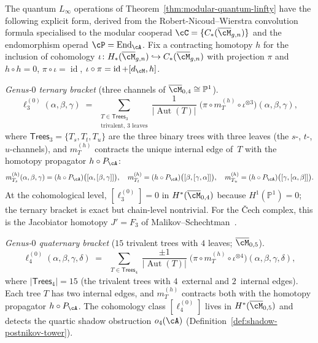 \begin{construction}
\label{constr:explicit-convolution-linfty}
The quantum $L_\infty$ operations of
Theorem~\textup{\ref{thm:modular-quantum-linfty}} have the following
explicit form, derived from the Robert-Nicoud--Wierstra convolution
formula \cite[Theorem~5.1]{RNW19} specialised to the modular
cooperad $\cC = \{C_*(\overline{\cM}_{g,n})\}$ and the
endomorphism operad $\cP = \operatorname{End}_{\cA}$.  Fix a contracting
homotopy $h$ for the inclusion of cohomology
$\iota\colon H_*(\overline{\cM}_{g,n}) \hookrightarrow
C_*(\overline{\cM}_{g,n})$ with projection $\pi$ and
$h \circ h = 0$, $\pi \circ \iota = \operatorname{id}$,
$\iota \circ \pi = \operatorname{id} + [d_{\cM}, h]$.

\emph{Genus-$0$ ternary bracket}
\textup{(}three channels of $\overline{\cM}_{0,4} \cong \mathbb{P}^1$\textup{)}.
\begin{equation}
\label{eq:ell3-explicit}
\ell_3^{(0)}(\alpha,\beta,\gamma)
\;=\;
\sum_{\substack{T \in \mathsf{Trees}_3 \\ \text{trivalent, 3 leaves}}}
\frac{1}{|\operatorname{Aut}(T)|}
\;\bigl(\pi \circ m_T^{(h)} \circ \iota^{\otimes 3}\bigr)
(\alpha,\beta,\gamma),
\end{equation}
where $\mathsf{Trees}_3 = \{T_s, T_t, T_u\}$ are the three binary
trees with three leaves (the $s$-, $t$-, $u$-channels), and
$m_T^{(h)}$ contracts the unique internal edge of~$T$ with the
homotopy propagator $h \circ P_{\cA}$:
\[
m_{T_s}^{(h)}(\alpha,\beta,\gamma)
= (h \circ P_{\cA})\bigl([\alpha, [\beta, \gamma]]\bigr), \quad
m_{T_t}^{(h)}
= (h \circ P_{\cA})\bigl([\beta, [\gamma, \alpha]]\bigr), \quad
m_{T_u}^{(h)}
= (h \circ P_{\cA})\bigl([\gamma, [\alpha, \beta]]\bigr).
\]
At the cohomological level,
$[\ell_3^{(0)}] = 0$ in $H^*(\overline{\cM}_{0,4})$ because
$H^1(\mathbb{P}^1) = 0$; the ternary bracket is exact but
chain-level nontrivial.  For the \v{C}ech complex, this is the
Jacobiator homotopy $J' = F_3$ of
Malikov--Schechtman~\cite{MS24}.

\emph{Genus-$0$ quaternary bracket}
\textup{(}$15$ trivalent trees with $4$ leaves;
$\overline{\cM}_{0,5}$\textup{)}.
\begin{equation}
\label{eq:ell4-explicit}
\ell_4^{(0)}(\alpha,\beta,\gamma,\delta)
\;=\;
\sum_{\substack{T \in \mathsf{Trees}_4}}
\frac{\pm 1}{|\operatorname{Aut}(T)|}
\;\bigl(\pi \circ m_T^{(h)} \circ \iota^{\otimes 4}\bigr)
(\alpha,\beta,\gamma,\delta),
\end{equation}
where $|\mathsf{Trees}_4| = 15$ (the trivalent trees with
$4$~external and $2$~internal edges).  Each tree $T$ has two
internal edges, and $m_T^{(h)}$ contracts both with the homotopy
propagator $h \circ P_{\cA}$.  The cohomology class $[\ell_4^{(0)}]$
lives in $H^*(\overline{\cM}_{0,5})$ and detects the quartic shadow
obstruction $o_4(\cA)$
\textup{(}Definition~\textup{\ref{def:shadow-postnikov-tower})}.


\end{construction}
